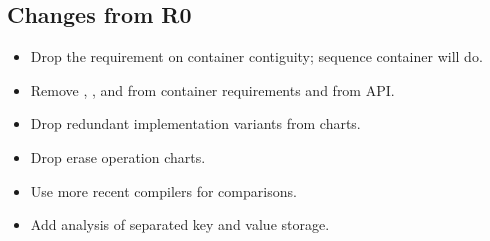 \subsection{Changes from R0}

\begin{itemize}
  \item Drop the requirement on container contiguity; sequence container will
    do.
  \item Remove , , and 
    from container requirements and from  API.
  \item Drop redundant implementation variants from charts.
  \item Drop erase operation charts.
  \item Use more recent compilers for comparisons.
  \item Add analysis of separated key and value storage.
\end{itemize}
